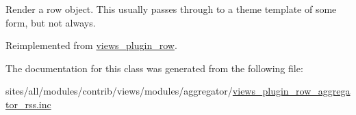 Render a row object. This usually passes through to a theme template of some form, but not always. 

Reimplemented from \hyperlink{classviews__plugin__row_8243842e087dd28664b32cef0309f2a6}{views\_\-plugin\_\-row}.

The documentation for this class was generated from the following file:\begin{CompactItemize}
\item 
sites/all/modules/contrib/views/modules/aggregator/\hyperlink{views__plugin__row__aggregator__rss_8inc}{views\_\-plugin\_\-row\_\-aggregator\_\-rss.inc}\end{CompactItemize}
